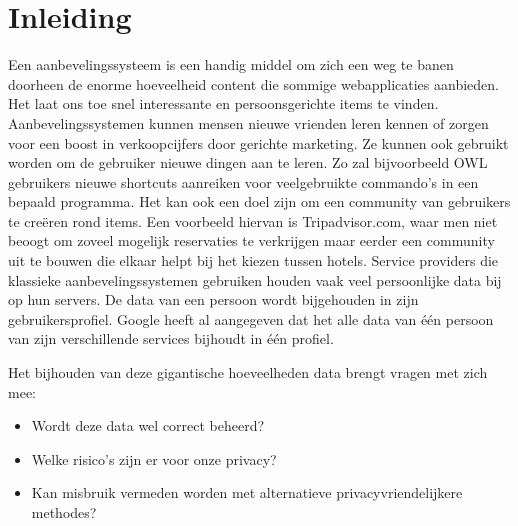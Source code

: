 \chapter{Inleiding}
Een aanbevelingssysteem is een handig middel om zich een weg te banen doorheen de enorme hoeveelheid content die sommige webapplicaties aanbieden. Het laat ons toe snel interessante en persoonsgerichte items te vinden.
Aanbevelingssystemen kunnen mensen nieuwe vrienden leren kennen of zorgen voor een boost in verkoopcijfers door gerichte marketing. Ze kunnen ook gebruikt worden om de gebruiker nieuwe dingen aan te leren. Zo zal bijvoorbeeld OWL \cite{Linton00owl} gebruikers nieuwe shortcuts aanreiken voor veelgebruikte commando's in een bepaald programma. Het kan ook een doel zijn om een community van gebruikers te cre\"eren rond items. Een voorbeeld hiervan is Tripadvisor.com, waar men niet beoogt om zoveel mogelijk reservaties te verkrijgen maar eerder een community uit te bouwen die elkaar helpt bij het kiezen tussen hotels. 
Service providers die klassieke aanbevelingssystemen gebruiken houden vaak veel persoonlijke data bij op hun servers. De data van een persoon wordt bijgehouden in zijn gebruikersprofiel. Google heeft al aangegeven dat het alle data van \'e\'en persoon van zijn verschillende services bijhoudt in \'e\'en profiel. 

Het bijhouden van deze gigantische hoeveelheden data brengt vragen met zich mee:
\begin{itemize}
 
\item Wordt deze data wel correct beheerd? 
\item Welke risico's zijn er voor onze privacy?
\item Kan misbruik vermeden worden met alternatieve privacyvriendelijkere methodes?
\end{itemize}

